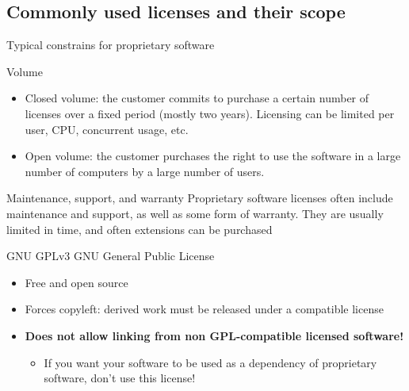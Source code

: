 \documentclass[presentation]{beamer}
\begin{document}
\subsection{Commonly used licenses and their scope}

\begin{frame}{Typical constrains for proprietary software}
    \begin{block}{Volume}
        \begin{itemize}
            \item Closed volume: the customer commits to purchase a certain number of licenses over a fixed period (mostly two years). Licensing can be limited per user, CPU, concurrent usage, etc.
            \item Open volume: the customer purchases the right to use the software in a large number of computers by a large number of users.
        \end{itemize}
    \end{block}
    \begin{block}{Maintenance, support, and warranty}
        Proprietary software licenses often include maintenance and support, as well as some form of warranty. They are usually limited in time, and often extensions can be purchased
    \end{block}
\end{frame}

\begin{frame}{GNU GPLv3}
    GNU General Public License
    \begin{itemize}
        \item Free and open source
        \item Forces copyleft: derived work must be released under a compatible license
        \item \textbf{Does not allow linking from non GPL-compatible licensed software!}
        \begin{itemize}
            \item If you want your software to be used as a dependency of proprietary software, don't use this license!
        \end{itemize}
    \end{itemize}
\end{frame}
\end{document}
